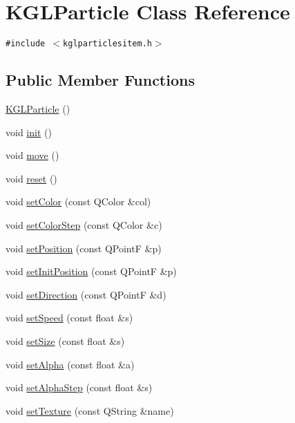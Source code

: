 \hypertarget{class_k_g_l_particle}{
\section{KGLParticle Class Reference}
\label{class_k_g_l_particle}
}
{\tt \#include $<$kglparticlesitem.h$>$}

\subsection*{Public Member Functions}
\begin{CompactItemize}
\item 
\hyperlink{class_k_g_l_particle_0b2a6cb94ef297c99e6471dd91a1376d}{KGLParticle} ()
\item 
void \hyperlink{class_k_g_l_particle_810f22cab6cd83fb40175c07976d97f5}{init} ()
\item 
void \hyperlink{class_k_g_l_particle_5e7afc417a0368d3b1b05973782267e7}{move} ()
\item 
void \hyperlink{class_k_g_l_particle_28a0fed37487b9b14f822b5b30ff5e09}{reset} ()
\item 
void \hyperlink{class_k_g_l_particle_e4f6170615e9a4318b71e54146e81bb5}{setColor} (const QColor \&col)
\item 
void \hyperlink{class_k_g_l_particle_0cbaf806d3692135ff4a874b0c9e0cfc}{setColorStep} (const QColor \&c)
\item 
void \hyperlink{class_k_g_l_particle_e760126a7614c2f9e353354159125a3a}{setPosition} (const QPointF \&p)
\item 
void \hyperlink{class_k_g_l_particle_28b82ab43a56e3016477e9b42c334bda}{setInitPosition} (const QPointF \&p)
\item 
void \hyperlink{class_k_g_l_particle_c2e395f657d6bac641bbd4b3e34e6304}{setDirection} (const QPointF \&d)
\item 
void \hyperlink{class_k_g_l_particle_4d17097516ffa4248e359c14e3b8d3dc}{setSpeed} (const float \&s)
\item 
void \hyperlink{class_k_g_l_particle_7eac7336cf145c7b2f53e239d63734f4}{setSize} (const float \&s)
\item 
void \hyperlink{class_k_g_l_particle_4ad871207f00236ff4aef3711710771f}{setAlpha} (const float \&a)
\item 
void \hyperlink{class_k_g_l_particle_410d9b3a43554f25386763f3a1800eeb}{setAlphaStep} (const float \&s)
\item 
void \hyperlink{class_k_g_l_particle_47978679ec7686a3031bc429eb3079b7}{setTexture} (const QString \&name)

\end{CompactItemize}
